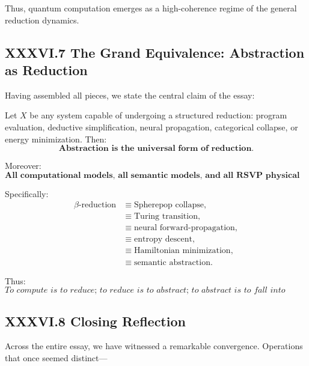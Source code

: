 \documentclass[11pt,letterpaper]{article}
\begin{document}
Thus, quantum computation emerges as a high-coherence regime 
of the general reduction dynamics.

\subsection{XXXVI.7 The Grand Equivalence: Abstraction as Reduction}

Having assembled all pieces, we state the central claim of the essay:

\begin{theorem}
Let $X$ be any system capable of undergoing a structured reduction:
program evaluation, deductive simplification, neural propagation, 
categorical collapse, or energy minimization.
Then:
\[
\boxed{
\textbf{Abstraction is the universal form of reduction.}
}
\]

Moreover:
\[
\textbf{
All computational models,  
all semantic models,  
and all RSVP physical models  
instantiate the same reduction dynamics.}
\]

Specifically:
\[
\begin{aligned}
\beta\text{-reduction}
&\equiv \text{Spherepop collapse},\\
&\equiv \text{Turing transition},\\
&\equiv \text{neural forward-propagation},\\
&\equiv \text{entropy descent},\\
&\equiv \text{Hamiltonian minimization},\\
&\equiv \text{semantic abstraction}.
\end{aligned}
\]

Thus:
\[
\boxed{
\textit{To compute is to reduce;  
to reduce is to abstract;  
to abstract is to fall into alignment with the structure of meaning.}
}
\]
\end{theorem}

\subsection{XXXVI.8 Closing Reflection}

Across the entire essay, we have witnessed a remarkable convergence.  
Operations that once seemed distinct—
\end{document}
